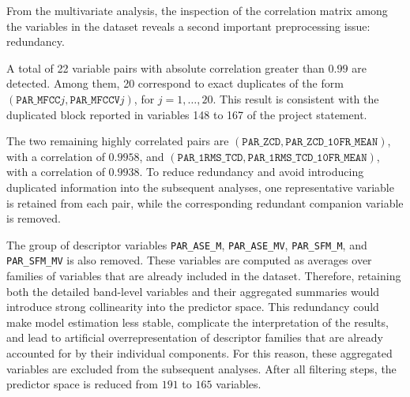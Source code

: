 From the multivariate analysis, the inspection of the correlation matrix among the variables in the dataset reveals a second important preprocessing issue: redundancy.

A total of 22 variable pairs with absolute correlation greater than \(0.99\) are detected. Among them, 20 correspond to exact duplicates of the form \((\texttt{PAR\_MFCC}j, \texttt{PAR\_MFCCV}j)\), for \(j = 1, \ldots, 20\). This result is consistent with the duplicated block reported in variables 148 to 167 of the project statement.

The two remaining highly correlated pairs are \((\texttt{PAR\_ZCD}, \texttt{PAR\_ZCD\_10FR\_MEAN})\), with a correlation of \(0.9958\), and \((\texttt{PAR\_1RMS\_TCD}, \texttt{PAR\_1RMS\_TCD\_10FR\_MEAN})\), with a correlation of \(0.9938\). To reduce redundancy and avoid introducing duplicated information into the subsequent analyses, one representative variable is retained from each pair, while the corresponding redundant companion variable is removed.

The group of descriptor variables \texttt{PAR\_ASE\_M}, \texttt{PAR\_ASE\_MV}, \texttt{PAR\_SFM\_M}, and \texttt{PAR\_SFM\_MV} is also removed. These variables are computed as averages over families of variables that are already included in the dataset. Therefore, retaining both the detailed band-level variables and their aggregated summaries would introduce strong collinearity into the predictor space. This redundancy could make model estimation less stable, complicate the interpretation of the results, and lead to artificial overrepresentation of descriptor families that are already accounted for by their individual components. For this reason, these aggregated variables are excluded from the subsequent analyses. After all filtering steps, the predictor space is reduced from \(191\) to \(165\) variables.